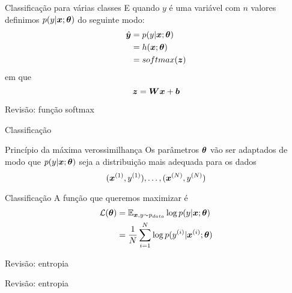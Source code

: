 \documentclass[10pt]{beamer}
\begin{document}
\begin{frame}{Classificação para várias classes}
E quando $y$ é uma variável com $n$ valores definimos $p(y | \bm{x}; \bm{\theta})$ do seguinte modo:
\Large{
\begin{align*}
\hat{\bm{y}} &= p(y| \bm{x}; \bm{\theta})\\
&= h(\bm{x}; \bm{\theta}) \\
&= softmax(\bm{z})\\
\end{align*}
}
em que 
\begin{equation*}
\bm{z} = \bm{W}\bm{x} + \bm{b}
\end{equation*}

\end{frame}

\begin{frame}[fragile]{Revisão: função softmax}

\end{frame}

\begin{frame}{Classificação}

\end{frame}


\begin{frame}{Princípio da máxima verossimilhança}
Os parâmetros $\bm{\theta}$ vão ser adaptados de modo que  $p(y| \bm{x};\bm{\theta})$ seja a distribuição mais adequada para os dados
\begin{equation*}
(\bm{x}^{(1)},y^{(1)}), \dots, (\bm{x}^{(N)},y^{(N)})
\end{equation*}
\end{frame}

\begin{frame}{Classificação}
A função que queremos maximizar é
\Large{
\begin{align*}
\mathcal{L}(\bm{\theta}) &= \operatorname{\mathbb{E}}_{\bm{x},y \sim p_{data}} \log p(y| \bm{x}; \bm{\theta})\\
&= \frac{1}{N}\sum_{i=1}^{N}\log p(y^{(i)}| \bm{x}^{(i)}; \bm{\theta})\\
\end{align*}
}
\end{frame}

\begin{frame}{Revisão: entropia}

\end{frame}

\begin{frame}{Revisão: entropia}

\end{frame}
\end{document}
